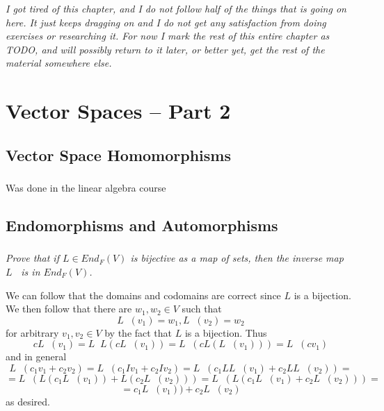 \documentclass[11pt,oneside,titlepage]{book}
\DeclareMathOperator \inv {^{-1}}
\begin{document}
\textit{I got tired of this chapter, and I do not follow half of the
  things that is going on here. It just keeps dragging on and I do not
  get any satisfaction from doing exercises or researching it. For now I
  mark the rest of this entire chapter as TODO, and will possibly return
  to it later, or better yet, get the rest of the material somewhere
  else.}

\chapter{Vector Spaces -- Part 2}

\section{Vector Space Homomorphisms}

\subsection{}

Was done in the linear algebra course

\section{Endomorphisms and Automorphisms}


\subsection{}

\textit{Prove that if $L \in End_F(V)$ is bijective as a map of sets, then the
  inverse map $L\inv$ is in $End_F(V)$.}

We can follow that the domains and codomains are correct since $L$ is a bijection.
We then follow that there are $w_1, w_2 \in V$ such that 
$$L\inv(v_1) = w_1, L\inv(v_2) = w_2$$
for arbitrary $v_1, v_2 \in V$ by the fact that $L$ is a bijection. Thus
$$c L\inv(v_1) = L\inv L (c L\inv(v_1) ) = L\inv (c L (L\inv (v_1))) = L\inv (c v_1)$$
and in general
$$L\inv(c_1 v_1 + c_2 v_2) = L\inv(c_1 I v_1 + c_2 I v_2) = L\inv(c_1 L L\inv(v_1) + c_2 L L\inv(v_2)) = $$
$$ = L\inv(L(c_1L\inv(v_1)) + L(c_2  L\inv(v_2))) = L\inv(L(c_1L\inv(v_1) + c_2  L\inv(v_2))) = $$
$$ = c_1L\inv(v_1)) + c_2  L\inv(v_2)$$
as desired.

\subsection{}
\end{document}
